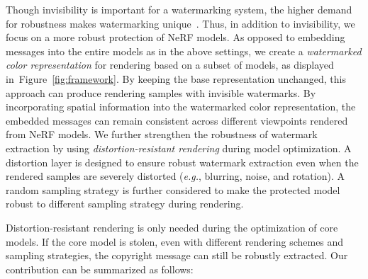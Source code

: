 \documentclass[10pt,twocolumn,letterpaper]{article}
\def\eg{{\emph{e.g.}}}
\newcommand{\Fref}[1]{Figure~\ref{#1}}
\def\eg{\emph{e.g.}}
\def\eg{{\emph{e.g.}}}
\newcommand{\renjie}[1]{\textcolor{red}{{#1}}}
\begin{document}
Though invisibility is important for a watermarking system, the higher demand for robustness makes watermarking unique~\cite{zhu2018hidden}. Thus, in addition to invisibility, we focus on a more robust protection of NeRF models. As opposed to embedding messages into the entire models as in the above settings, we create a \textit{watermarked color representation} for rendering based on a subset of models, as displayed in~\Fref{fig:framework}. By keeping the base representation unchanged, this approach can produce rendering samples with invisible watermarks. By incorporating spatial information into the watermarked color representation, the embedded messages can remain consistent across different viewpoints rendered from NeRF models. We further strengthen the robustness of watermark extraction by using \textit{distortion-resistant rendering} during model optimization. A distortion layer is designed to ensure robust watermark extraction even when the rendered samples are severely distorted (\eg, blurring, noise, and rotation). A random sampling strategy is further considered to make the protected model robust to different sampling strategy during rendering. 

Distortion-resistant rendering is only needed during the optimization of core models. If the core model is stolen, even with different rendering schemes and sampling strategies, the copyright message can still be robustly extracted. Our contribution can be summarized as follows:






\end{document}
